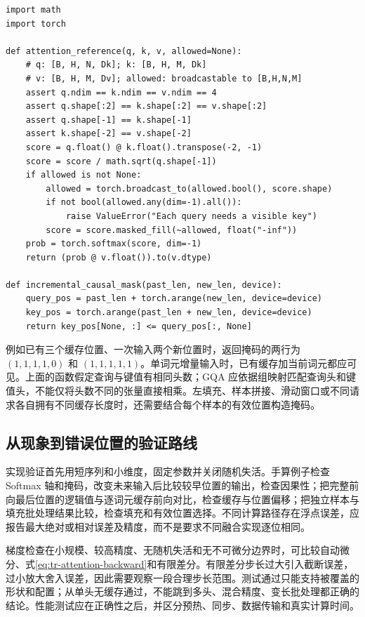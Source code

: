 \documentclass[UTF8,12pt,a4paper,fontset=fandol]{ctexart}
\begin{document}
\begin{verbatim}
import math
import torch

def attention_reference(q, k, v, allowed=None):
    # q: [B, H, N, Dk]; k: [B, H, M, Dk]
    # v: [B, H, M, Dv]; allowed: broadcastable to [B,H,N,M]
    assert q.ndim == k.ndim == v.ndim == 4
    assert q.shape[:2] == k.shape[:2] == v.shape[:2]
    assert q.shape[-1] == k.shape[-1]
    assert k.shape[-2] == v.shape[-2]
    score = q.float() @ k.float().transpose(-2, -1)
    score = score / math.sqrt(q.shape[-1])
    if allowed is not None:
        allowed = torch.broadcast_to(allowed.bool(), score.shape)
        if not bool(allowed.any(dim=-1).all()):
            raise ValueError("Each query needs a visible key")
        score = score.masked_fill(~allowed, float("-inf"))
    prob = torch.softmax(score, dim=-1)
    return (prob @ v.float()).to(v.dtype)

def incremental_causal_mask(past_len, new_len, device):
    query_pos = past_len + torch.arange(new_len, device=device)
    key_pos = torch.arange(past_len + new_len, device=device)
    return key_pos[None, :] <= query_pos[:, None]
\end{verbatim}

例如已有三个缓存位置、一次输入两个新位置时，返回掩码的两行为 $(1,1,1,1,0)$ 和 $(1,1,1,1,1)$。单词元增量输入时，已有缓存加当前词元都应可见。上面的函数假定查询与键值有相同头数；GQA 应依据组映射匹配查询头和键值头，不能仅将头数不同的张量直接相乘。左填充、样本拼接、滑动窗口或不同请求各自拥有不同缓存长度时，还需要结合每个样本的有效位置构造掩码。

\subsection{从现象到错误位置的验证路线}

实现验证首先用短序列和小维度，固定参数并关闭随机失活。手算例子检查 Softmax 轴和掩码，改变未来输入后比较较早位置的输出，检查因果性；把完整前向最后位置的逻辑值与逐词元缓存前向对比，检查缓存与位置偏移；把独立样本与填充批处理结果比较，检查填充和有效位置选择。不同计算路径存在浮点误差，应报告最大绝对或相对误差及精度，而不是要求不同融合实现逐位相同。

梯度检查在小规模、较高精度、无随机失活和无不可微分边界时，可比较自动微分、式\eqref{eq:tr-attention-backward}和有限差分。有限差分步长过大引入截断误差，过小放大舍入误差，因此需要观察一段合理步长范围。测试通过只能支持被覆盖的形状和配置；从单头无缓存通过，不能跳到多头、混合精度、变长批处理都正确的结论。性能测试应在正确性之后，并区分预热、同步、数据传输和真实计算时间。
\end{document}
